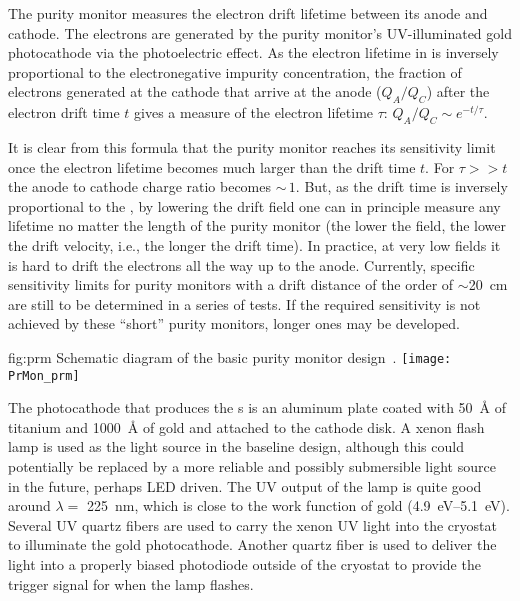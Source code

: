 The purity monitor measures the electron drift lifetime between its anode and cathode. The electrons are generated by the purity monitor's UV-illuminated gold photocathode via the photoelectric effect. As the electron lifetime in \lar is inversely proportional to the electronegative impurity concentration, the fraction of electrons generated at the cathode that arrive at the anode ($Q_A/Q_C$) after the electron drift time $t$ gives a measure of the electron lifetime $\tau$:
%
\( Q_A/Q_C \sim e^{-t/\tau}.\)
%

It is clear from this formula that the purity monitor reaches its sensitivity limit once the electron lifetime becomes much larger than the drift time $t$. For $\tau >> t$ the anode to cathode charge ratio becomes $\sim\,1$. But, as the drift time is inversely proportional to the \efield, by lowering the drift field one can in principle measure any lifetime no matter the length of the purity monitor (the lower the field, the lower the drift velocity, i.e., the longer the drift time). 
In practice, at very low fields it is hard to drift the electrons all the way up to the anode. Currently, specific sensitivity limits for purity monitors with a drift distance of the order of $\sim$\SI{20}{\centi\meter} are still to be determined in a series of tests. If the required sensitivity is not achieved by these ``short'' purity monitors, longer ones may be developed.

\begin{dunefigure}{fig:prm}
  {Schematic diagram of the basic purity monitor design~\cite{Adamowski:2014daa}.}
  \texttt{[image: PrMon\_prm]}
\end{dunefigure}

The photocathode that produces the \phel{}s is an aluminum plate coated with \SI{50}{\angstrom} of titanium and \SI{1000}{\angstrom} of gold and attached to the cathode disk. A xenon flash lamp is used as the light source in the baseline design, although this could potentially be replaced by a more reliable and possibly submersible light source in the future, perhaps LED driven. The UV output of the lamp is quite good around $\lambda=$ \SI{225}{\nano\meter}, which is close to the work function of gold (\SIrange{4.9}{5.1}{\eV}). Several UV quartz fibers are used to carry the xenon UV light into the cryostat to illuminate the gold photocathode.   Another quartz fiber is used to deliver the light into a properly biased photodiode outside of the cryostat to provide the trigger signal for when the lamp flashes. 

